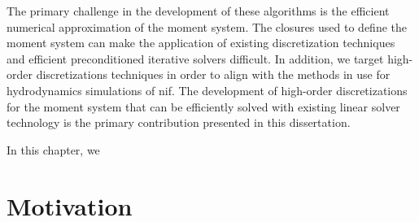 \documentclass[../doc.tex]{subfiles}
\begin{document}
The primary challenge in the development of these algorithms is the efficient numerical approximation of the moment system. The closures used to define the moment system can make the application of existing discretization techniques and efficient preconditioned iterative solvers difficult. In addition, we target high-order discretizations techniques in order to align with the methods in use for hydrodynamics simulations of \gls{nif}. The development of high-order discretizations for the moment system that can be efficiently solved with existing linear solver technology is the primary contribution presented in this dissertation. 

In this chapter, we 

\section{Motivation}
\end{document}
